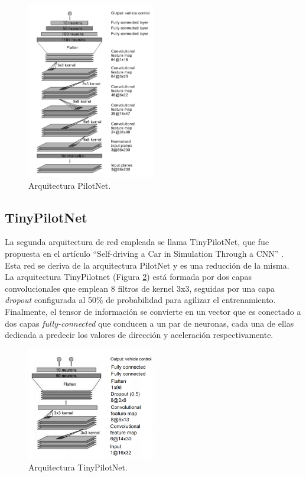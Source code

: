 \begin{figure}
\begin{center}
	\includegraphics[width=0.5\textwidth]{figures/Regresion/pilotnet.png}
   \caption{Arquitectura PilotNet.}
	\label{fig.Pilotnet}
\end{center}
\end{figure}


\subsection{TinyPilotNet}

La segunda arquitectura de red empleada se llama TinyPilotNet, que fue propuesta en el artículo ``Self-driving a Car in Simulation Through a CNN'' \cite{self-driving}. Esta red se deriva de la arquitectura PilotNet \cite{end2end} \cite{explaining-end2end} y es una reducción de la misma.\\

La arquitectura TinyPilotnet (Figura \ref{fig.TinyPilotNet}) está formada por dos capas  convolucionales que emplean 8 filtros de kernel 3x3, seguidas por una capa \textit{dropout} configurada al 50\% de probabilidad para agilizar el entrenamiento. Finalmente, el tensor de información se convierte en un vector que es conectado a dos capas \textit{fully-connected} que conducen a un par de neuronas, cada una de ellas dedicada a predecir los valores de dirección y aceleración respectivamente. \\

\begin{figure}
\begin{center}
	\includegraphics[width=0.5\textwidth]{figures/Regresion/tinypilotnet.png}
   \caption{Arquitectura TinyPilotNet.}
	\label{fig.TinyPilotNet}
\end{center}
\end{figure}


